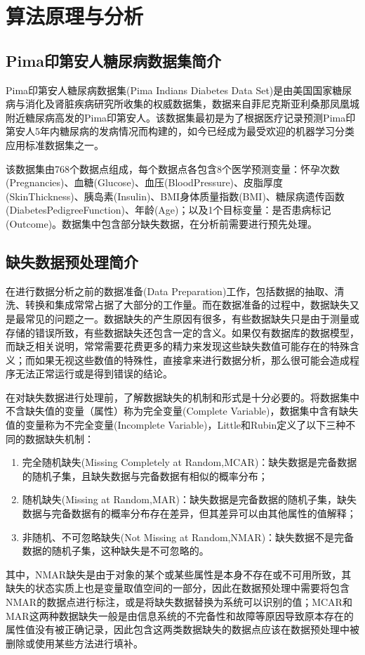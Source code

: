 \documentclass[a4paper]{ctexart}
\begin{document}
\section{算法原理与分析}
\subsection{Pima印第安人糖尿病数据集简介}
Pima印第安人糖尿病数据集(Pima Indians Diabetes Data Set)是由美国国家糖尿病与消化及肾脏疾病研究所收集的权威数据集，数据来自菲尼克斯亚利桑那凤凰城附近糖尿病高发的Pima印第安人\cite{RN162}。该数据集最初是为了根据医疗记录预测Pima印第安人5年内糖尿病的发病情况而构建的，如今已经成为最受欢迎的机器学习分类应用标准数据集之一。

该数据集由768个数据点组成，每个数据点各包含8个医学预测变量：怀孕次数(Pregnancies)、血糖(Glucose)、血压(BloodPressure)、皮脂厚度(SkinThickness)、胰岛素(Insulin)、BMI身体质量指数(BMI)、糖尿病遗传函数(DiabetesPedigreeFunction)、年龄(Age)；以及1个目标变量：是否患病标记(Outcome)。数据集中包含部分缺失数据，在分析前需要进行预先处理。

\subsection{缺失数据预处理简介}\label{sec:缺失数据预处理简介}
在进行数据分析之前的数据准备(Data Preparation)工作，包括数据的抽取、清洗、转换和集成常常占据了大部分的工作量。而在数据准备的过程中，数据缺失又是最常见的问题之一。数据缺失的产生原因有很多，有些数据缺失只是由于测量或存储的错误所致，有些数据缺失还包含一定的含义\cite{RN163}。如果仅有数据库的数据模型，而缺乏相关说明，常常需要花费更多的精力来发现这些缺失数值可能存在的特殊含义；而如果无视这些数值的特殊性，直接拿来进行数据分析，那么很可能会造成程序无法正常运行或是得到错误的结论。

在对缺失数据进行处理前，了解数据缺失的机制和形式是十分必要的。将数据集中不含缺失值的变量（属性）称为完全变量(Complete Variable)，数据集中含有缺失值的变量称为不完全变量(Incomplete Variable)，Little和Rubin定义了以下三种不同的数据缺失机制\cite{RN163,RN165}：
\begin{enumerate}[label=(\arabic*)]
	\item 完全随机缺失(Missing Completely at Random,MCAR)：缺失数据是完备数据的随机子集，且缺失数据与完备数据有相似的概率分布；
	\item 随机缺失(Missing at Random,MAR)：缺失数据是完备数据的随机子集，缺失数据与完备数据有的概率分布存在差异，但其差异可以由其他属性的值解释；
	\item 非随机、不可忽略缺失(Not Missing at Random,NMAR)：缺失数据不是完备数据的随机子集，这种缺失是不可忽略的。
\end{enumerate}
其中，NMAR缺失是由于对象的某个或某些属性是本身不存在或不可用所致，其缺失的状态实质上也是变量取值空间的一部分，因此在数据预处理中需要将包含NMAR的数据点进行标注，或是将缺失数据替换为系统可以识别的值；MCAR和MAR这两种数据缺失一般是由信息系统的不完备性和故障等原因导致原本存在的属性值没有被正确记录，因此包含这两类数据缺失的数据点应该在数据预处理中被删除或使用某些方法进行填补\cite{RN167}。
\end{document}
